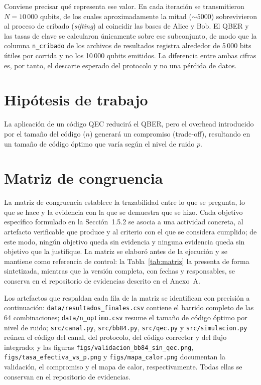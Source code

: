 \documentclass[12pt]{report}
\begin{document}
Conviene precisar qué representa ese valor. En cada iteración se transmitieron \(N = 10\,000\) qubits, de los cuales aproximadamente la mitad (\(\sim 5000\)) sobrevivieron al proceso de cribado (\textit{sifting}) al coincidir las bases de Alice y Bob. El QBER y las tasas de clave se calcularon únicamente sobre ese subconjunto, de modo que la columna \texttt{n\_cribado} de los archivos de resultados registra alrededor de 5\,000 bits útiles por corrida y no los 10\,000 qubits emitidos. La diferencia entre ambas cifras es, por tanto, el descarte esperado del protocolo y no una pérdida de datos.

\section{Hipótesis de trabajo}
La aplicación de un código QEC reducirá el QBER, pero el overhead introducido por el tamaño del código (\(n\)) generará un compromiso (trade-off), resultando en un tamaño de código óptimo que varía según el nivel de ruido \(p\).

\section{Matriz de congruencia}

La matriz de congruencia establece la trazabilidad entre lo que se pregunta, lo
que se hace y la evidencia con la que se demuestra que se hizo. Cada objetivo
específico formulado en la Sección~1.5.2 se asocia a una actividad concreta, al
artefacto verificable que produce y al criterio con el que se considera cumplido;
de este modo, ningún objetivo queda sin evidencia y ninguna evidencia queda sin
objetivo que la justifique. La matriz se elaboró antes de la ejecución y se
mantiene como referencia de control: la Tabla~\ref{tab:matriz} la presenta de
forma sintetizada, mientras que la versión completa, con fechas y responsables,
se conserva en el repositorio de evidencias descrito en el Anexo~A.

Los artefactos que respaldan cada fila de la matriz se identifican con precisión
a continuación: \texttt{data/resultados\_finales.csv} contiene el barrido
completo de las 64 combinaciones; \texttt{data/n\_optimo.csv} resume el tamaño de
código óptimo por nivel de ruido; \texttt{src/canal.py}, \texttt{src/bb84.py},
\texttt{src/qec.py} y \texttt{src/simulacion.py} reúnen el código del canal, del
protocolo, del código corrector y del flujo integrado; y las figuras
\texttt{figs/validacion\_bb84\_sin\_qec.png},
\texttt{figs/tasa\_efectiva\_vs\_p.png} y \texttt{figs/mapa\_calor.png}
documentan la validación, el compromiso y el mapa de calor, respectivamente.
Todas ellas se conservan en el repositorio de evidencias.
\end{document}
